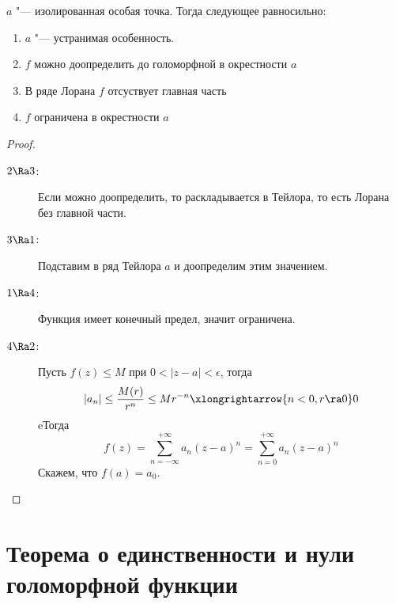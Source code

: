 \begin{theorem}
	$a$ "--- изолированная особая точка.
	Тогда следующее равносильно:
	\begin{enumerate}
		\item $a$ "--- устранимая особенность.
		\item $f$ можно доопределить до голоморфной в окрестности $a$
		\item В ряде Лорана $f$ отсуствует главная часть
		\item $f$ ограничена в окрестности $a$
	\end{enumerate}
\end{theorem}
\begin{proof}\begin{description}
\item[$2 \Ra 3$:]
	Если можно доопределить, то раскладывается в Тейлора, то есть Лорана без главной части.

\item[$3 \Ra 1$:]
	Подставим в ряд Тейлора $a$ и доопределим этим значением.

\item[$1 \Ra 4$:]
	Функция имеет конечный предел, значит ограничена.

\item[$4 \Ra 2$:]
	Пусть $f(z) \le M$ при $0 < |z - a| < \epsilon$, тогда
	\[ |a_n| \le \frac{M(r)}{r^n} \le M r^{-n} \xlongrightarrow{n < 0, r \ra 0} 0 \]
	eТогда
	\[ f(z) = \sum_{n=-\infty}^{+\infty} a_n (z-a)^n = \sum_{n=0}^{+\infty} a_n (z-a)^n \]
	Скажем, что $f(a) = a_0$.
\end{description}\end{proof}

\section[Т-ма о единствнности, нули голоморной ф-ции]{Теорема о единственности и нули голоморфной функции}

